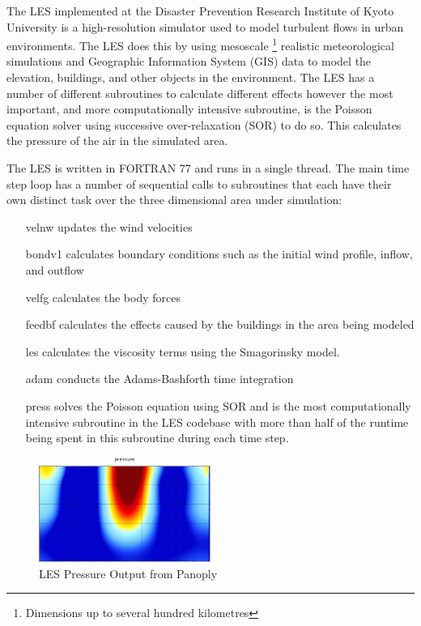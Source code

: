 The LES implemented at the Disaster Prevention Research Institute of Kyoto
University is a high-resolution simulator used to model turbulent flows in urban
environments. The LES does this by using mesoscale \footnote{Dimensions up to
several hundred kilometres} realistic meteorological simulations and Geographic
Information System (GIS) data to model the elevation, buildings, and other
objects in the environment. The LES has a number of different subroutines to
calculate different effects however the most important, and more computationally
intensive subroutine, is the Poisson equation solver using successive
over-relaxation (SOR) to do so. This calculates the pressure of the air in the
simulated area.

The LES is written in FORTRAN 77 and runs in a single thread. The main time step
loop has a number of sequential calls to subroutines that each have their own
distinct task over the three dimensional area under simulation:

\begin{itemize}[noitemsep,nolistsep]

    \item[velnw] updates the wind velocities

    \item[bondv1] calculates boundary conditions such as the initial wind
    profile, inflow, and outflow

    \item[velfg] calculates the body forces

    \item[feedbf] calculates the effects caused by the buildings in the area
    being modeled

    \item[les] calculates the viscosity terms using the Smagorinsky model.

    \item[adam] conducts the Adams-Bashforth time integration

    \item[press] solves the Poisson equation using SOR and is the most
    computationally intensive subroutine in the LES codebase with more than half
    of the runtime being spent in this subroutine during each time step.

\end{itemize}

\begin{figure}
    \includegraphics[width=0.5\textwidth]{graphs/pressure_in_LES_output_p.png}
    \caption{LES Pressure Output from Panoply}
    \label{fig:lespressure}
\end{figure}

